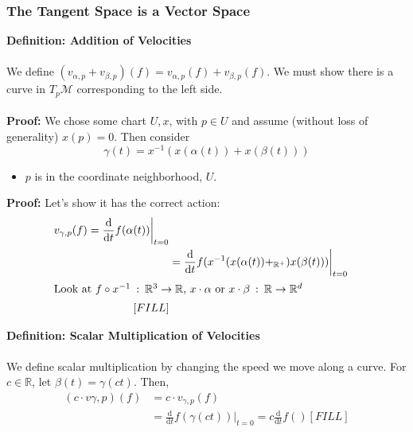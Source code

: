 \documentclass[10pt]{article}
\newcommand{\R}{\mathbb{R}}
\begin{document}
\subsubsection*{The Tangent Space is a Vector Space}
\textbf{Definition: Addition of Velocities}\\\\
We define $(v_{\alpha, p} + v_{\beta, p})(f) = v_{\alpha, p}(f) + v_{\beta, p}(f)$.  We must show there is a curve in $T_p \mathcal{M}$ corresponding to the left side.\\\\
\textbf{Proof:}  We chose some chart $U, x$, with $p \in U$ and assume (without loss of generality) $x(p) = 0$.  Then consider
\[\gamma(t) = x^{-1}(x(\alpha(t)) + x(\beta(t)))\]
\begin{itemize}
    \item $p$ is in the coordinate neighborhood, $U$.
\end{itemize}
\textbf{Proof:}
Let's show it has the correct action:
\begin{align*}
    v_{\gamma, p} (f) = \frac{\text{d}}{\text{d}t} f(\alpha(t)) \bigg|_{t = 0} \\
    &= \frac{\text{d}}{\text{d}t} f(x^{-1}(x(\alpha(t)) +_{\mathbb{R}^+}) x(\beta(t)))\bigg|_{t = 0}\\
    \intertext{Look at $f \circ x^{-1}\::\: \R^3 \rightarrow \R$, $x \cdot \alpha$ or $x \cdot \beta \::\: \R \rightarrow \R^d$}
    [FILL]
\end{align*}

\textbf{Definition: Scalar Multiplication of Velocities}\\\\
We define scalar multiplication by changing the speed we move along a curve.  For $c \in \R$, let $\beta(t) = \gamma(ct)$.  Then,
\begin{align*}
    (c \cdot v{\gamma, p})(f) &= c \cdot v_{\gamma, p}(f)\\
    &= \frac{\text{d}}{\text{d}t} f(\gamma(ct)) \bigg|_{t = 0} = c \frac{\text{d}}{\text{d}t} f()
    [FILL]
\end{align*}
\end{document}
